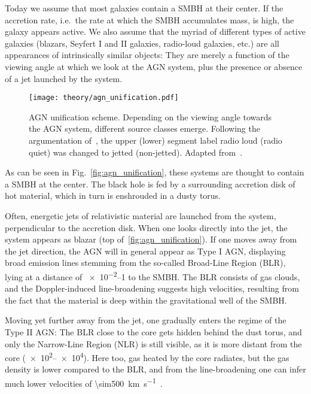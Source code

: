 Today we assume that most galaxies contain a SMBH at their center. If the accretion rate, i.e.\ the rate at which the SMBH accumulates mass, is high, the galaxy appears active. We also assume that the myriad of different types of active galaxies (blazars, Seyfert I and II galaxies, radio-loud galaxies, etc.) are all appearances of intrinsically similar objects: They are merely a function of the viewing angle at which we look at the AGN system, plus the presence or absence of a jet launched by the system.

\begin{figure}[htb]
    \texttt{[image: theory/agn\_unification.pdf]}
    \caption[AGN unification scheme]{AGN unification scheme. Depending on the viewing angle towards the AGN system, different source classes emerge. Following the argumentation of~\cite{Padovani2017}, the upper (lower) segment label radio loud (radio quiet) was changed to jetted (non-jetted). Adapted from~\cite{Thorne2022}.}
\end{figure}

As can be seen in Fig.~\ref{fig:agn_unification}, these systems are thought to contain a SMBH at the center. The black hole is fed by a surrounding accretion disk of hot material, which in turn is enshrouded in a dusty torus.

Often, energetic jets of relativistic material are launched from the system, perpendicular to the accretion disk. When one looks directly into the jet, the system appears as blazar (top of~\ref{fig:agn_unification}). If one moves away from the jet direction, the AGN will in general appear as Type I AGN, displaying broad emission lines stemming from the so-called Broad-Line Region (BLR), lying at a distance of \SIrange{e-2}{1}{\parsec} to the SMBH. The BLR consists of gas clouds, and the Doppler-induced line-broadening suggests high velocities, resulting from the fact that the material is deep within the gravitational well of the SMBH.

Moving yet further away from the jet, one gradually enters the regime of the Type II AGN: The BLR close to the core gets hidden behind the dust torus, and only the  Narrow-Line Region (NLR) is still visible, as it is more distant from the core (\SIrange{e2}{e4}{\parsec}). Here too, gas heated by the core radiates, but the gas density is lower compared to the BLR, and from the line-broadening one can infer much lower velocities of \SI{\sim500}{\kilo\m\per\s}~.

